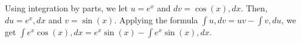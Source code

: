 Using integration by parts, we let $u = e^x$ and $dv = \cos(x) , dx$. Then, $du = e^x , dx$ and $v = \sin(x)$. Applying the formula $\int u , dv = uv - \int v , du$, we get $\int e^x \cos(x) , dx = e^x \sin(x) - \int e^x \sin(x) , dx$.
